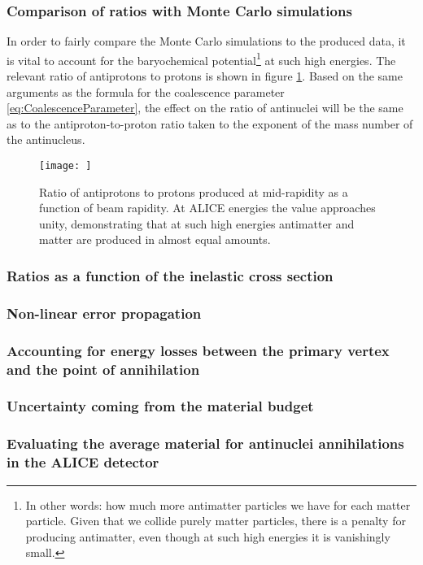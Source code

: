 \subsubsection{Comparison of ratios with Monte Carlo simulations}\label{sec:MCSim}
In order to fairly compare the Monte Carlo simulations to the produced data, it is vital to account for the baryochemical potential\footnote{In other words: how much more antimatter particles we have for each matter particle. Given that we collide purely matter particles, there is a penalty for producing antimatter, even though at such high energies it is vanishingly small.} at such high energies. The relevant ratio of antiprotons to protons is shown in figure \ref{fig:BaryochemicalPotential}. Based on the same arguments as the formula for the coalescence parameter \ref{eq:CoalescenceParameter}, the effect on the ratio of antinuclei will be the same as to the antiproton-to-proton ratio taken to the exponent of the mass number of the antinucleus. 

\begin{figure}
    \centering
    \texttt{[image: ]}
    \caption{Ratio of antiprotons to protons produced at mid-rapidity as a function of beam rapidity. At ALICE energies the value approaches unity, demonstrating that at such high energies antimatter and matter are produced in almost equal amounts.}
    \label{fig:BaryochemicalPotential}
\end{figure}
\subsubsection{Ratios as a function of the inelastic cross section}
\subsubsection{Non-linear error propagation}
\subsubsection{Accounting for energy losses between the primary vertex and the point of annihilation}
\subsubsection{Uncertainty coming from the material budget}
\subsubsection{Evaluating the average material for antinuclei annihilations in the ALICE detector}
